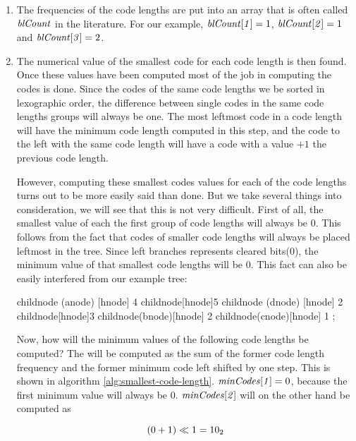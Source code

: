 \begin{enumerate}
\item The frequencies of the code lengths are put into an array that
  is often called $\mathit{blCount}$ in the  literature. For our
  example, $\mathit{blCount[1]} = 1$, $\mathit{blCount[2]} = 1$ and
  $\mathit{blCount[3]} = 2$.

\item The numerical value of the smallest code for each code length is
  then found. Once these values have been computed most of the job in
  computing the codes is done. Since the codes of the same code
  lengths we be sorted in lexographic order, the difference between
  single codes in the same code lengths groups will always be one. The
  most leftmost code in a code length will have the minimum code
  length computed in this step, and the code to the left with the same
  code length will have a code with a value $+1$ the previous code
  length.

  However, computing these smallest codes values for each of the code
  lengths turns out to be more easily said than done. But we take
  several things into consideration, we will see that this is not very
  difficult. First of all, the smallest value of each the first group
  of code lengths will always be $0$. This follows from the fact that
  codes of smaller code lengths will always be placed leftmost in the
  tree. Since left branches represents cleared bits($0$), the minimum
  value of that smallest code lengths will be $0$. This fact can also
  be easily interfered from our example tree:

\begin{huffmanc}
  child{node (anode) [hnode] {4}}
  child{node[hnode]{5}
    child{node (dnode) [hnode] {2}}
    child{node[hnode]{3}
      child{node(bnode)[hnode] {2}}
      child{node(cnode)[hnode] {1}}
    }};

\end{huffmanc}

Now, how will the minimum values of the following code lengths be
computed? The will be computed as the sum of the former code length
frequency and the former minimum code left shifted by one step. This
is shown in algorithm
\ref{alg:smallest-code-length}. $\mathit{minCodes[1]} = 0$, because the
first minimum value will always be 0. $\mathit{minCodes[2]}$ will on the
  other hand be computed as

  \begin{equation*}
    (0 + 1) \ll 1 = \mbox{\ensuremath{10_2}}
  \end{equation*}


\end{enumerate}
